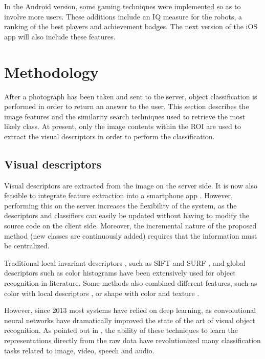 \documentclass[final, twocolumn]{elsarticle}
\begin{document}
In the Android version, some gaming techniques were implemented so as to involve more users. These additions include an IQ measure for the robots, a ranking of the best players and achievement badges. The next version of the iOS app will also include these features.




\section{Methodology}
\label{methodology}

After a photograph has been taken and sent to the server, object classification is performed in order to return an answer to the user. This section describes the image features and the similarity search techniques used to retrieve the most likely class. At present, only the image contents within the ROI are used to extract the visual descriptors in order to perform the classification.


\subsection{Visual descriptors}
\label{features}

Visual descriptors are extracted from the image on the server side. It is now also feasible to integrate feature extraction into a smartphone app \cite{mobilenets}. However, performing this on the server increases the flexibility of the system, as the descriptors and classifiers can easily be updated without having to modify the source code on the client side. Moreover, the incremental nature of the proposed method (new classes are continuously added) requires that the information must be centralized. 

Traditional local invariant descriptors \citep{Mikolajczyk2004ScaleDetectors}, such as SIFT   \cite{Lowe2004DistinctiveKeypoints} and SURF \cite{Bay2008Speeded-UpSURF}, and global descriptors such as color histograms \citep{vandeSande2010EvaluatingRecognition, Jeong2001Histogram-BasedRetrieval} have been extensively used for object recognition in literature. Some methods also combined different features, such as color with local descriptors \citep{Fernando2012DiscriminativeClassification}, or shape with color and texture \citep{Banerji2013NewClassification}. 

However, since 2013 most systems have relied on deep learning, as convolutional neural networks have dramatically improved the state of the art of visual object recognition. As pointed out in \cite{LeCun2015DeepLearning}, the ability of these techniques to learn the representations directly from the raw data  have revolutionized many classification tasks related to image, video, speech and audio.
\end{document}
